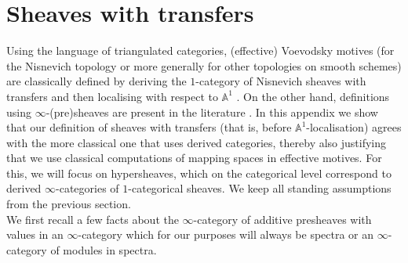 \documentclass[reqno]{amsart}
\numberwithin{equation}{section}\theoremstyle{thms}
\theoremstyle{defn}
\newcommand{\bA}{\mathbb{A}}
\begin{document}
\appendix
\section{Sheaves with transfers}\label{sec:sheaveswithtransfers}

Using the language of triangulated categories, (effective) Voevodsky motives (for the Nisnevich topology or more generally for other topologies on smooth schemes) are classically defined by deriving the $1$-category of Nisnevich sheaves with transfers and then localising with respect to $\bA^1$ \cite[§11]{cd19}. On the other hand, definitions using $\infty$-(pre)sheaves are present in the literature \cite{ek20,bh21}. In this appendix we show that our definition of sheaves with transfers (that is, before $\bA^1$-localisation) agrees with the more classical one that uses derived categories, thereby also justifying that we use classical computations of mapping spaces in effective motives. For this, we will focus on hypersheaves, which on the categorical level correspond to derived $\infty$-categories of $1$-categorical sheaves. We keep all standing assumptions from the previous section. \\
We first recall a few facts about the $\infty$-category of additive presheaves with values in an $\infty$-category which for our purposes will always be spectra or an $\infty$-category of modules in spectra.
\end{document}

